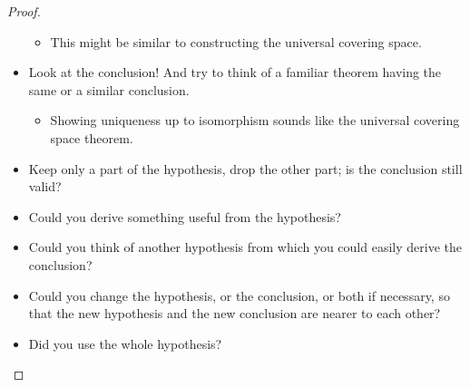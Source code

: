 \documentclass[12pt, psamsfonts]{amsart}
\theoremstyle{definition}
\theoremstyle{remark}
\numberwithin{equation}{section}
\begin{document}
\begin{proof}
\begin{itemize}
    \begin{itemize}
      \item
        This might be similar to constructing the universal covering space.
    \end{itemize}
  \item Look at the conclusion! And try to think of a familiar theorem having the same or a similar conclusion.
    \begin{itemize}
      \item
        Showing uniqueness up to isomorphism sounds like the universal covering space theorem.
    \end{itemize}
  \item Keep only a part of the hypothesis, drop the other part; is the conclusion still valid?
  \item Could you derive something useful from the hypothesis?
  \item Could you think of another hypothesis from which you could easily derive the conclusion?
  \item Could you change the hypothesis, or the conclusion, or both if necessary, so that the new hypothesis and the new conclusion are nearer to each other?
  \item Did you use the whole hypothesis?
\end{itemize}
\end{proof}
\end{document}
